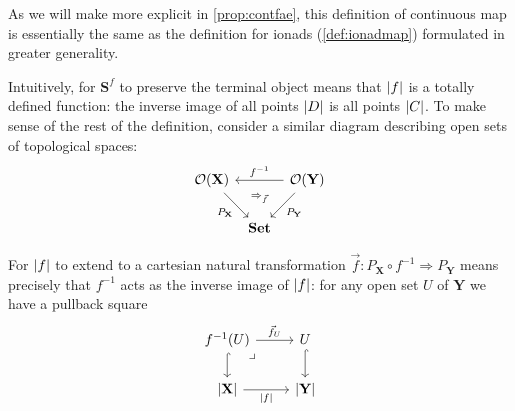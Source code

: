\documentclass[11pt, oneside, article]{memoir}
\theoremstyle{plain}
\theoremstyle{definition}
\theoremstyle{remark}
\newenvironment{example}
{\renewcommand\qedsymbol{$\lrcorner$}%
  \pushQED{\qed}\myexample}
{\popQED\endmyexample}
\DeclareMathOperator{\Sh}{Sh}
\DeclareMathOperator{\Psh}{Psh}
\DeclarePairedDelimiter{\abs}{\lvert}{\rvert}
\newcommand{\namedcat}[1]{\mathbf{#1}}
\newcommand{\cat}[1]{\mathbf{#1}}
\newcommand{\spa}[1]{\mathbf{#1}}
\newcommand{\Set}{\namedcat{Set}}
\newcommand{\pts}[1]{{\abs{#1}}}
\newcommand{\obs}[1]{\pts{#1}}
\newcommand{\one}[1]{\pts{#1}}
\newcommand{\ph}[1]{#1}
\newcommand{\con}[2]{{#1}^{#2}}
\newcommand{\connat}[1]{\vec{#1}}
\newcommand{\contop}[1]{{#1}^{-1}}
\newcommand{\Ps}[1]{\Psh(#1)}
\newcommand{\cmnd}[1]{{#1}}
\newcommand{\cC}{\cmnd{C}}
\newcommand{\cD}{\cmnd{D}}
\newcommand{\bC}{\cat{C}}
\newcommand{\bD}{\cat{D}}
\newcommand{\bS}{\cat{S}}
\newcommand{\pP}{\ph{P}}
\newcommand{\tX}{\spa{X}}
\newcommand{\tY}{\spa{Y}}
\newcommand{\cX}{\toptocmd{\tX}}
\newcommand{\cY}{\toptocmd{\tY}}
\newcommand{\cbC}{\cattocmd{\bC}}
\newcommand{\cbD}{\cattocmd{\bD}}
\newcommand{\cattocmd}[1]{{{#1}^\bullet}}
\newcommand{\toptocmd}[1]{{{#1}^\circ}}
\newcommand{\opens}[1]{\mathcal{O}(#1)}
\begin{document}
As we will make more explicit in \cref{prop:contfae}, this definition
of continuous map is essentially the same as the definition for ionads
(\cref{def:ionadmap}) formulated in greater generality.

Intuitively, for $\con{\bS}{f}$ to preserve the terminal object means that
$\one{f}$ is a totally defined function: the inverse image of all
points $\pts{\cD}$ is all points $\pts{\cC}$. To make sense of the
rest of the definition, consider a similar diagram describing open
sets of topological spaces:
\[\begin{tikzcd}[column sep=5pt]
    \opens{\tX} && \opens{\tY} \\
    & \Set
    \arrow["{\contop{f}}"', from=1-3, to=1-1]
    \arrow["\pP_\tX"', ""{name=0, anchor=center, inner sep=0}, from=1-1, to=2-2]
    \arrow["\pP_\tY", ""{name=1, anchor=center, inner sep=0}, from=1-3, to=2-2]
    \arrow["\Rightarrow_{\connat{f}}", shift right=10pt, draw=none, from=1, to=0]
  \end{tikzcd}\]

For $\one{f}$ to extend to a cartesian natural transformation
$\connat{f}\colon \pP_\tX \circ \contop{f} \Rightarrow \pP_\tY$ means
precisely that $\contop{f}$ acts as the inverse image of $\one{f}$:
for any open set $U$ of $\tY$ we have a pullback square
\[
  \begin{tikzcd}
    \contop{f}(U)\ar[r, "\connat{f}_U"]\ar[d,hook]&U\ar[d,hook]\\
    \pts{\tX}\ar[r, "\one{f}"']&\pts{\tY}\ar[ul,phantom,very near end, "\lrcorner"]
  \end{tikzcd}
\]




\end{document}
